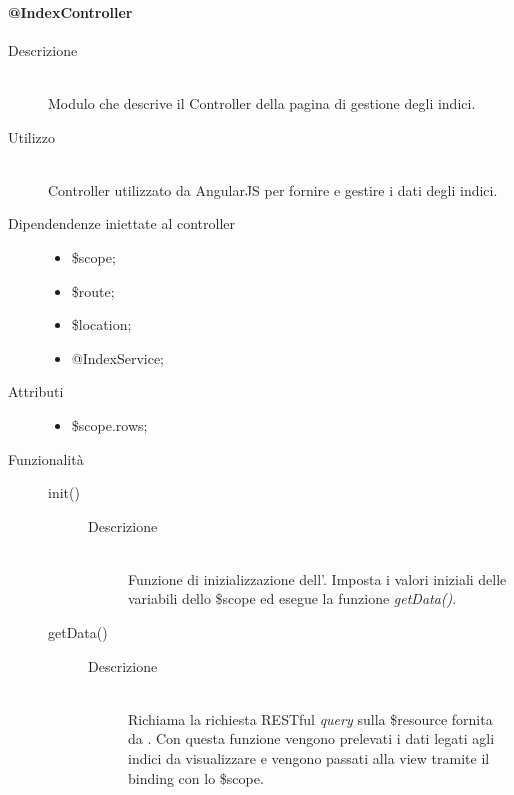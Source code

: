 \paragraph{@IndexController}
\begin{description}
 \item[Descrizione] \hfill \\
 Modulo che descrive il Controller della pagina di gestione degli indici.
 
 \item[Utilizzo] \hfill \\
 Controller utilizzato da AngularJS per fornire e gestire i dati degli indici.

 
 \item[Dipendendenze iniettate al controller] \hfill
 \begin{itemize}
  \item \$scope;
  \item \$route;
  \item \$location;
  \item @IndexService;
 \end{itemize}
 
 \item[Attributi] \hfill
 \begin{itemize}
 \item \$scope.rows;
 \end{itemize}

 \item[Funzionalità] \hfill 
 \begin{description}
  \item[init()] \hfill 
  	\begin{description}
  		\item[Descrizione] \hfill \\
  		Funzione di inizializzazione dell'. Imposta i valori iniziali delle variabili dello \$scope ed esegue la funzione \textit{getData()}.
  	\end{description}
  
  \item[getData()] \hfill 
  \begin{description}
  	\item[Descrizione] \hfill \\
  	Richiama la richiesta RESTful \textit{query} sulla \$resource fornita da .
  Con questa funzione vengono prelevati i dati legati agli indici da visualizzare e vengono passati alla  view tramite il binding con lo \$scope.
  \end{description}
  

\end{description}
\end{description}
